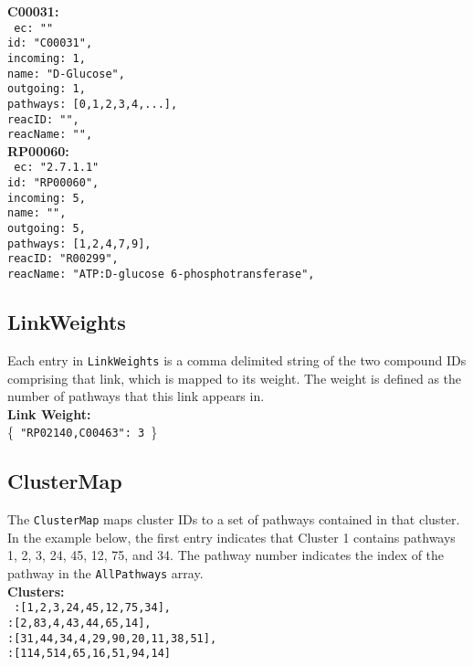 \documentclass{article}
\begin{document}
			\noindent \textbf{C00031:}\\
				\texttt{
					\indent ec:	"" \\
					\indent id:	"C00031",\\
					\indent incoming: 1,\\
					\indent name:	"D-Glucose",\\
					\indent outgoing: 1,\\
					\indent pathways: [0,1,2,3,4,...],\\
					\indent reacID:	"",\\
					\indent reacName: "",\\
				}
			\noindent \textbf{RP00060:}\\
				\texttt{
					\indent ec:	"2.7.1.1" \\
					\indent id:	"RP00060",\\
					\indent incoming: 5,\\
					\indent name:	"",\\
					\indent outgoing: 5,\\
					\indent pathways: [1,2,4,7,9],\\
					\indent reacID:	"R00299",\\
					\indent reacName: "ATP:D-glucose 6-phosphotransferase",\\
				}

			\subsection{LinkWeights}
			Each entry in \texttt{LinkWeights} is a comma delimited string of
			the two compound IDs comprising that link, which is mapped to its
			weight. The weight is defined as the number of pathways that this
			link appears in.\\

			\noindent \textbf{Link Weight:}\\
				\indent \{\texttt{
					 "RP02140,C00463": 3
				}\}

			\subsection{ClusterMap}
			The \texttt{ClusterMap} maps cluster IDs to a set of pathways
			contained in that cluster. In the example below, the first entry
			indicates that Cluster 1 contains pathways 1, 2, 3, 24, 45, 12, 75,
			and 34. The pathway number indicates the index of the pathway in
			the \texttt{AllPathways} array.\\

			\noindent \textbf{Clusters:}\\
				\texttt{
					:[1,2,3,24,45,12,75,34],\\
					:[2,83,4,43,44,65,14],\\
					:[31,44,34,4,29,90,20,11,38,51],\\
					:[114,514,65,16,51,94,14]\\
				}

\end{document}
